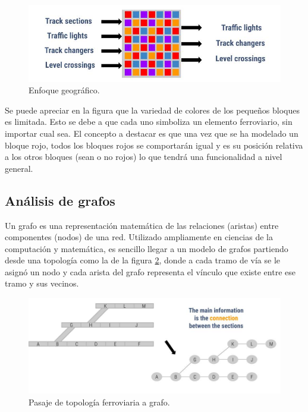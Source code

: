 		\begin{figure}[h]
		\centering
			\includegraphics[scale=.55]{./Figures/Geografico}
			\caption{Enfoque geográfico.}
			\label{fig:Enfoque_Geografico}
		\end{figure}

	Se puede apreciar en la figura que la variedad de colores de los pequeños bloques es limitada. Esto se debe a que cada uno simboliza un elemento ferroviario, sin importar cual sea. El concepto a destacar es que una vez que se ha modelado un bloque rojo, todos los bloques rojos se comportarán igual y es su posición relativa a los otros bloques (sean o no rojos) lo que tendrá una funcionalidad a nivel general.
	
	\subsection{Análisis de grafos}
		
		Un grafo es una representación matemática de las relaciones (aristas) entre componentes (nodos) de una red. Utilizado ampliamente en ciencias de la computación y matemática, es sencillo llegar a un modelo de grafos partiendo desde una topología como la de la figura \ref{fig:Topologia_Grafo}, donde a cada tramo de vía se le asignó un nodo y cada arista del grafo representa el vínculo que existe entre ese tramo y sus vecinos.
		
		\begin{figure}[h]
		\centering
			\includegraphics[scale=.4]{./Figures/Topologia_grafo}
			\caption{Pasaje de topología ferroviaria a grafo.}
			\label{fig:Topologia_Grafo}
		\end{figure}
	
